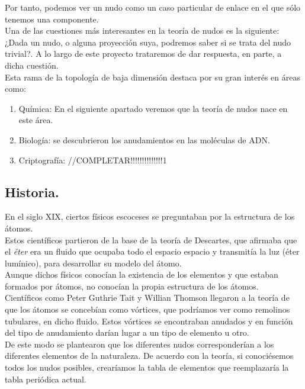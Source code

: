 \documentclass[14pt]{extarticle}
\begin{document}
    Por tanto, podemos ver un nudo como un caso particular de enlace en el que sólo tenemos una componente.\\
    
  Una de las cuestiones más interesantes en la teoría de nudos es la siguiente: \\
  ¿Dada un nudo, o alguna proyección suya, podremos saber si se trata del nudo trivial?. A lo largo de este proyecto trataremos de dar respuesta, en parte, a dicha cuestión.\\
  
  Esta rama de la topología de baja dimensión destaca por su gran interés en áreas como:
  \begin{enumerate}
  	\item Química: En el siguiente apartado veremos que la teoría de nudos nace en este área.
  	\item Biología: se descubrieron los anudamientos en las moléculas de ADN. 
  	\item Criptografía: 
  	//COMPLETAR!!!!!!!!!!!!!!1
  \end{enumerate}
 
  \newpage
\subsection{Historia.}
En el siglo XIX, ciertos físicos escoceses se preguntaban por la estructura de los átomos.\\
Estos científicos partieron de la base de la teoría de Descartes, que afirmaba que el \textit{éter} era un fluido que ocupaba todo el espacio espacio y transmitía la luz (éter lumínico), para desarrollar su modelo del átomo. \\
Aunque dichos físicos conocían la existencia de los elementos y que estaban formados por átomos, no conocían la propia estructura de los átomos. \\

Científicos como Peter Guthrie Tait y Willian Thomson llegaron a la teoría de que los átomos se concebían como vórtices, que podríamos ver como remolinos tubulares, en dicho fluido. Estos vórtices se encontraban anudados y en función del tipo de anudamiento darían lugar a un tipo de elemento u otro.\\
De este modo se plantearon que los diferentes nudos corresponderían a los diferentes elementos de la naturaleza. De acuerdo con la teoría, si conociésemos todos los nudos posibles, crearíamos la tabla de elementos que reemplazaría la tabla periódica actual. \\
\end{document}
